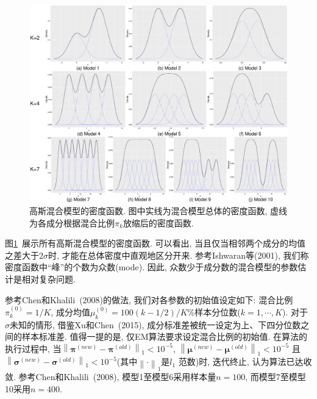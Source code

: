 \documentclass[a4paper,12pt,openany,oneside,utf-8]{ctexbook}
\newcommand{\wuhao}{\fontsize{10.5pt}{\baselineskip}\selectfont}
\begin{document}
\begin{figure}[hb!]
  \centering
  \includegraphics[width = 1\textwidth]{R_Plots_mixture_models_ALL.eps}
  \caption{高斯混合模型的密度函数. 图中实线为混合模型总体的密度函数, 虚线为各成分根据混合比例$\pi_k$放缩后的密度函数.}
  \label{fig:Plot of mixture models} %
\end{figure}

图\ref{fig:Plot of mixture models}~展示所有高斯混合模型的密度函数. 可以看出, 当且仅当相邻两个成分的均值之差大于$2\sigma$时, 才能在总体密度中直观地区分开来. 参考Ishwaran等(2001), 我们称密度函数中“峰”的个数为众数(mode). 因此, 众数少于成分数的混合模型的参数估计是相对复杂问题.

参考Chen和Khalili~(2008)的做法, 我们对各参数的初始值设定如下: 混合比例$\pi_k^{(0)}=1/K$, 成分均值$\mu_k^{(0)}=100(k-1/2)/K\%$样本分位数($k =1,\cdots,K$). 对于$\sigma$未知的情形, 借鉴Xu和Chen~(2015), 成分标准差被统一设定为上、下四分位数之间的样本标准差. 值得一提的是, 仅EM算法要求设定混合比例的初始值. 在算法的执行过程中, 当$\left\|\bm{\pi}^{(new)}-\bm{\pi}^{(old)}\right\|_1 < 10^{-5}$, $\left\|\bm{\mu}^{(new)}-\bm{\mu}^{(old)}\right\|_1 < 10^{-5}$ 且 $\left\|\bm{\sigma}^{(new)}-\bm{\sigma}^{(old)}\right\|_1 < 10^{-5}$(其中$\left\| \cdot \right\|_1$是$l_1$ 范数)时, 迭代终止, 认为算法已达收敛. 参考Chen和Khalili~(2008), 模型1至模型6采用样本量$n=100$, 而模型7至模型10采用$n=400$.
\end{document}
